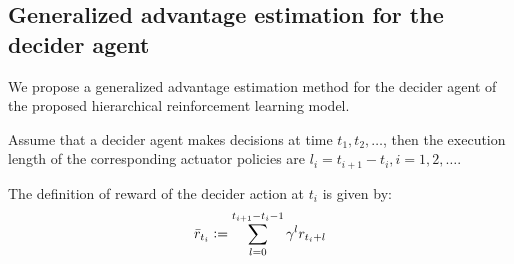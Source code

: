 \subsection{Generalized advantage estimation for the decider agent}
We propose a generalized advantage estimation method for the decider agent of the proposed hierarchical reinforcement learning model. 

Assume that a decider agent makes decisions at time $t_1,t_2,\dots$, then the execution length of the corresponding actuator policies are $l_i = t_{i+1} - t_i, i=1,2,\dots$.

The definition of reward of the decider action at $t_i$ is given by:
\begin{align}
\bar{r}_{t_i} \vcentcolon=
 \sum_{l=0}^{t_{i+1}-t_i-1}
  \gamma^l r_{t_i+l}
\end{align}

